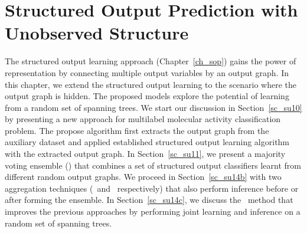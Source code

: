 {











%
\chapter{Structured Output Prediction with Unobserved Structure} \label{ch_sopw}

The structured output learning approach (Chapter~\ref{ch_sop}) gains the power of representation by connecting multiple output variables by an output graph.
In this chapter, we extend the structured output learning to the scenario where the output graph is hidden.
The proposed models explore the potential of learning from a random set of spanning trees.
We start our discussion in Section~\ref{sc_su10} by presenting a new approach for multilabel molecular activity classification problem.
The propose algorithm first extracts the output graph from the auxiliary dataset and applied established structured output learning algorithm with the extracted output graph.
In Section~\ref{sc_su11}, we present a majority voting ensemble (\mve) that combines a set of structured output classifiers learnt from different random output graphs.
We proceed in Section~\ref{sc_su14b} with two aggregation techniques (\amm\ and \mam\ respectively) that also perform inference before or after forming the ensemble.
In Section~\ref{sc_su14c}, we discuss the \rta\ method that improves the previous approaches by performing joint learning and inference on a random set of spanning trees.



}
